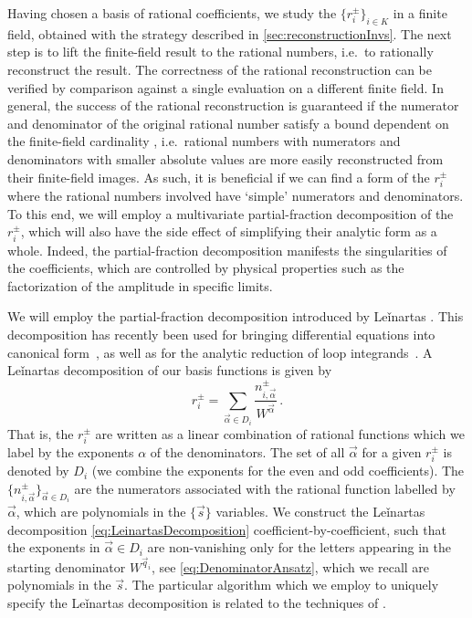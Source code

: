 Having chosen a basis of rational coefficients, we study the $\{r_i^\pm\}_{i\in K}$
in a finite field, obtained with the strategy described 
in \cref{sec:reconstructionInvs}.
The next step is to lift the finite-field result to the rational numbers, 
i.e.\  to rationally reconstruct the result. 
The correctness of the rational reconstruction can
be verified by comparison against a single evaluation on a
different finite field. 
In general, the success of the rational reconstruction is
guaranteed if the numerator and denominator of the original rational
number satisfy a bound dependent on the finite-field cardinality
\cite{Wang:1981:PAU:800206.806398, vonManteuffel:2014ixa, Peraro:2016wsq},
i.e.\  rational numbers with numerators and denominators with
smaller absolute values are more easily reconstructed from their finite-field
images. As such, it is beneficial if we can find a form of the
$r_i^\pm$ where the rational numbers involved have `simple' numerators and
denominators. 
To this end, we will employ a multivariate partial-fraction decomposition
of the $r_i^\pm$, which will also have the side effect of simplifying their
analytic form as a whole. 
Indeed, the partial-fraction decomposition manifests the singularities
of the coefficients, which are controlled by physical properties such
as the factorization of the amplitude in specific limits.


We will employ the partial-fraction decomposition introduced by
Leǐnartas \cite{leinartas1978factorization,raichev2012leinartas}.
This decomposition has recently been used for bringing differential equations into
canonical form~\cite{Meyer:2016slj}, as well as for the
analytic reduction of loop integrands~\cite{Zhang:2012ce, Mastrolia:2012an}.
A Leǐnartas decomposition of our basis functions is given by
\begin{equation}
    r_i^{\pm} = \sum_{\vec\alpha \in D_i} \frac{n^{\pm}_{i,\vec\alpha}}{ 
	W^{\vec\alpha} }\,.
    \label{eq:LeinartasDecomposition}
\end{equation}
That is, the $r_i^{\pm}$ are written as a linear combination of rational
functions which we label by the exponents $\alpha$ of the denominators.
The set of all $\vec\alpha$ for a given $r_i^{\pm}$ is denoted by $D_i$ (we combine
the exponents for the even and odd coefficients). The 
$\{n_{i,\vec\alpha}^\pm \}_{\vec\alpha\in D_i}$ are the numerators associated
with the rational function labelled by $\vec\alpha$,
which are polynomials in the $\{\vec s\}$ variables.
We construct the Leǐnartas decomposition 
\eqref{eq:LeinartasDecomposition} coefficient-by-coefficient, such that the exponents in 
$\vec\alpha\in D_i$ are non-vanishing only for the letters appearing 
in the starting denominator $W^{\vec q_i}$, see \cref{eq:DenominatorAnsatz}, 
which we recall are polynomials in the $\vec s$.
The particular algorithm which we employ to uniquely specify the 
Leǐnartas decomposition is related to the techniques 
of \cite{Smirnov:2005ky}.

